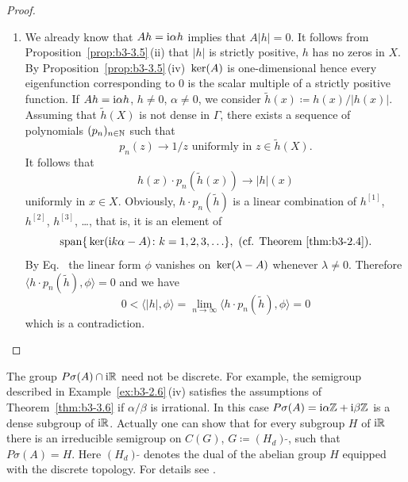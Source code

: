\begin{proof}
\begin{enumerate}[wide, labelindent=.25em]
	\item[(iii)] 
	We already know that $Ah = \mathrm{i}\alpha h$ implies that $A|h| = 0$.
	It follows from Proposition~\ref{prop:b3-3.5}\,(ii) that $|h|$ is strictly positive, \ie $h$ has no zeros in $X$.
	By Proposition~\ref{prop:b3-3.5}\,(iv) $\mathop{}\mathrm{ker}(A)$ is one-dimensional hence every
	eigenfunction corresponding to $0$ is the scalar multiple of a strictly positive function.
	If\/ $Ah = \mathrm{i}\alpha h$, $h \neq 0$, $\alpha \neq 0$, we consider $\tilde{h}(x) \coloneq h(x)/|h(x)|$.
	Assuming that $\tilde{h}(X)$ is not dense in $\Gamma$, there exists a sequence of polynomials $(p_{n})_{n\in\mathbb{N}}$ such that
	\begin{equation}\label{eq:b3-3.8}
		p_{n}(z) \to 1/z \text{ uniformly in } z \in \tilde{h}(X).
	\end{equation}
	It follows that 
    \[%
    h(x)\cdot p_{n}(\tilde{h}(x)) \to |h|(x)
    \]
    uniformly in $x \in X$.
	Obviously, $h\cdot p_{n}(\tilde{h})$ is a linear combination of\/ $h^{[1]}$, $h^{[2]}$, $h^{[3]}$, \ldots, that is, it is an element of
	\[
	\text{span$\{\Kern{ \im k\alpha - A} \colon  k=1,2,3,\ldots \}$}, \  \text{(\cf Theorem~\ref{thm:b3-2.4})}.
	\]
	By Eq.~ the linear form $\phi$ vanishes on $\mathop{}\mathrm{ker}(\lambda - A)$ whenever $\lambda \neq 0$.
	Therefore $\langle h\cdot p_{n}(\tilde{h}),\phi\rangle = 0$ and we have 
    \[
    0 < \langle|h|,\phi\rangle = \lim_{n\to\infty}\langle h\cdot p_{n}(\tilde{h}),\phi\rangle = 0
    \]
    which is a contradiction.
    \qedhere
	\end{enumerate}
\end{proof}
The group $P\sigma(A) \cap \mathrm{i}\mathbb{R}$ need not be discrete. 
For example, the semigroup described in Example~\ref{ex:b3-2.6}\,(iv) satisfies the assumptions of Theorem~\ref{thm:b3-3.6} if\/ ${\alpha}/{\beta}$ is irrational. 
In this case $P\sigma(A) = \mathrm{i}\alpha \mathbb{Z} + \mathrm{i}\beta \mathbb{Z}$ is a dense subgroup of\/ $\mathrm{i} \mathbb{R}$. 
Actually one can show that for every subgroup $H$ of\/ $\mathrm{i} \mathbb{R}$ there is an irreducible semigroup on $C(G)$, $G \coloneq (H_d)\,{\tilde{ }}$, such that $P\sigma(A) = H$. 
Here $(H_d)\,{\tilde{ }}$ denotes the dual of the abelian group $H$ equipped with the discrete topology. 
For details see \textcite[p.~62]{greiner:1982}. 

